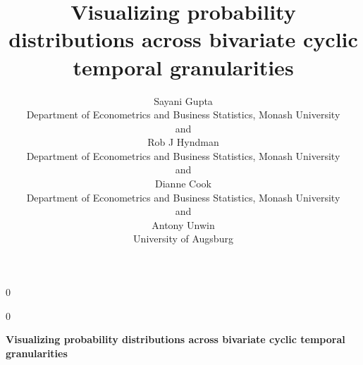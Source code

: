 \documentclass[12pt]{article}
\newcommand{\blind}{0}
\begin{document}
\def\spacingset#1{\renewcommand{\baselinestretch}%
{#1}\small\normalsize} \spacingset{1}



\blind
{
  \title{\bf Visualizing probability distributions across bivariate cyclic temporal granularities}

  \author{
        Sayani Gupta \\
    Department of Econometrics and Business Statistics, Monash University\\
     and \\     Rob J Hyndman \\
    Department of Econometrics and Business Statistics, Monash University\\
     and \\     Dianne Cook \\
    Department of Econometrics and Business Statistics, Monash University\\
     and \\     Antony Unwin \\
    University of Augsburg\\
      }
  \maketitle
} \fi

\blind
{
  \bigskip
  \bigskip
  \bigskip
  \begin{center}
    {\LARGE\bf Visualizing probability distributions across bivariate cyclic temporal granularities}
  \end{center}
  \medskip
} \fi
\end{document}

